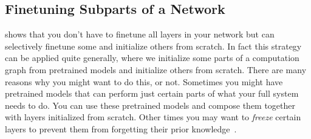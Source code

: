 

\subsection{Finetuning Subparts of a Network}
\Fig{\ref{fig:transfer_learning:finetuning_stages}} shows that you don't have to finetune all layers in your network but can selectively finetune some and initialize others from scratch. In fact this strategy can be applied quite generally, where we initialize some parts of a computation graph from pretrained models and initialize others from scratch. There are many reasons why you might want to do this, or not. Sometimes you might have pretrained models that can perform just certain parts of what your full system needs to do. You can use these pretrained models and compose them together with layers initialized from scratch. Other times you may want to \textit{freeze} certain layers to prevent them from forgetting their prior knowledge~\cite{zhang2023adding}.

